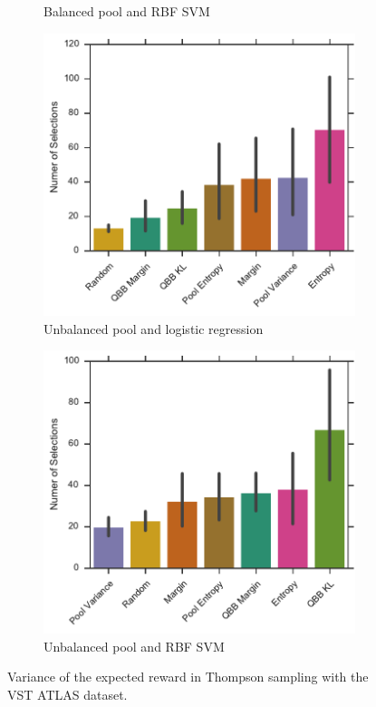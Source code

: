 \begin{figure}[p]
\begin{subfigure}{.5\textwidth}
		\caption{Balanced pool and RBF SVM}
		\label{fig:vstatlas_br_no_selections}
	\end{subfigure}
	\begin{subfigure}{.5\textwidth}
		\centering
		\includegraphics[width=\textwidth]{figures/5_thompson/vstatlas_ul_no_selections}
		\caption{Unbalanced pool and logistic regression}
		\label{fig:vstatlas_ul_no_selections}
	\end{subfigure}%
	\begin{subfigure}{.5\textwidth}
		\centering
		\includegraphics[width=\linewidth]{figures/5_thompson/vstatlas_ur_no_selections}
		\caption{Unbalanced pool and RBF SVM}
		\label{fig:vstatlas_ur_no_selections}
	\end{subfigure}
	\caption[Variance of heuristics (VST ATLAS)]{
		Variance of the expected reward in Thompson sampling with the VST ATLAS dataset.}
	\label{fig:vstatlas_no_selections}
\end{figure}


